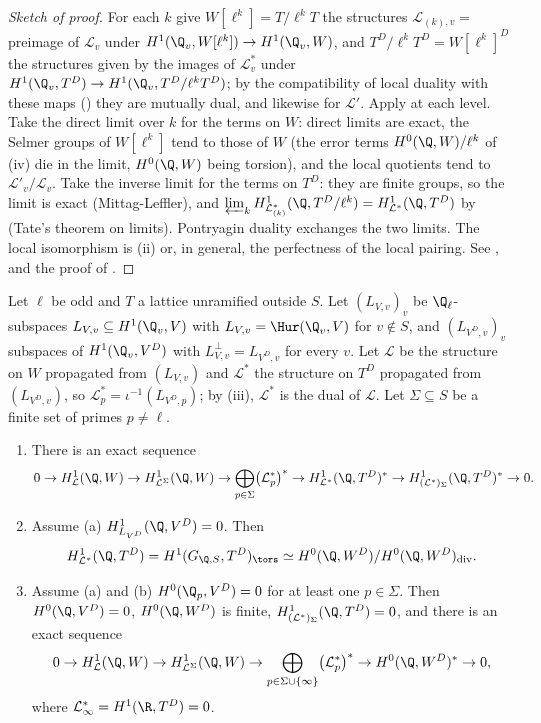 \begin{proof}[Sketch of proof]
For each $k$ give $W[\ell^k]=T/\ell^kT$ the structures $\mathcal L_{(k),v}=$ preimage of $\mathcal L_v$ under $H^1(\Q_v,W[\ell^k])\to H^1(\Q_v,W)$, and $T^D/\ell^kT^D=W[\ell^k]^D$ the
structures given by the images of $\mathcal L^*_v$ under $H^1(\Q_v,T^D)\to H^1(\Q_v,T^D/\ell^kT^D)$; by the compatibility of local duality with these maps
() they are mutually dual, and likewise for $\mathcal L'$. Apply  at each level. Take the direct limit over $k$ for the terms on
$W$: direct limits are exact, the Selmer groups of $W[\ell^k]$ tend to those of $W$ (the error terms $H^0(\Q,W)/\ell^k$ of (iv) die in the limit, $H^0(\Q,W)$
being torsion), and the local quotients tend to $\mathcal L'_v/\mathcal L_v$. Take the inverse limit for the terms on $T^D$: they are finite groups, so the limit is exact (Mittag-Leffler),
and $\varprojlim_kH^1_{\mathcal L^*_{(k)}}(\Q,T^D/\ell^k)=H^1_{\mathcal L^*}(\Q,T^D)$ by  (Tate's theorem on limits). Pontryagin duality exchanges the two limits. The
local isomorphism is (ii) or, in general, the perfectness of the local pairing. See \cite[Section 1.7 and Appendix B]{Rubin},
\cite[Section 4]{Greenberg89} and the proof of \cite[Lemma 2.1]{DFG04}.
\end{proof}

\begin{theorem}\label{thm:galcoh:relaxing-sigma}
Let $\ell$ be odd and $T$ a lattice unramified outside $S$. Let $(L_{V,v})_v$ be $\Q_\ell$-subspaces $L_{V,v}\subseteq H^1(\Q_v,V)$ with $L_{V,v}=\Hur(\Q_v,V)$ for $v\notin S$, and
$(L_{V^D,v})_v$ subspaces of $H^1(\Q_v,V^D)$ with $L_{V,v}^\perp=L_{V^D,v}$ for every $v$. Let $\mathcal L$ be the structure on $W$ propagated from $(L_{V,v})$ and $\mathcal L^*$ the structure
on $T^D$ propagated from $(L_{V^D,v})$, so $\mathcal L^*_p=\iota^{-1}(L_{V^D,p})$; by (iii), $\mathcal L^*$ is the dual of $\mathcal L$. Let $\Sigma\subseteq S$ be a finite
set of primes $p\ne\ell$.
\begin{enumerate}[label=(\roman*)]
\item There is an exact sequence
\[
0\to H^1_{\mathcal L}(\Q,W)\to H^1_{\mathcal L^\Sigma}(\Q,W)\to\bigoplus_{p\in\Sigma}\bigl(\mathcal L^*_p\bigr)^*\to H^1_{\mathcal L^*}(\Q,T^D)^*\to H^1_{(\mathcal L^*)_\Sigma}(\Q,T^D)^*\to0 .
\]
\item Assume (a) $H^1_{L_{V^D}}(\Q,V^D)=0$. Then
\[
H^1_{\mathcal L^*}(\Q,T^D)=H^1(G_{\Q,S},T^D)_{\tors}\simeq H^0(\Q,W^D)/H^0(\Q,W^D)_{\mathrm{div}}.
\]
\item Assume (a) and (b) $H^0(\Q_p,V^D)=0$ for at least one $p\in\Sigma$. Then $H^0(\Q,V^D)=0$, $H^0(\Q,W^D)$ is finite, $H^1_{(\mathcal L^*)_\Sigma}(\Q,T^D)=0$, and there is an exact
sequence
\[
0\to H^1_{\mathcal L}(\Q,W)\to H^1_{\mathcal L^\Sigma}(\Q,W)\to\bigoplus_{p\in\Sigma\cup\{\infty\}}\bigl(\mathcal L^*_p\bigr)^*\to H^0(\Q,W^D)^*\to0,
\]
where $\mathcal L^*_\infty=H^1(\R,T^D)=0$.
\end{enumerate}
\end{theorem}

